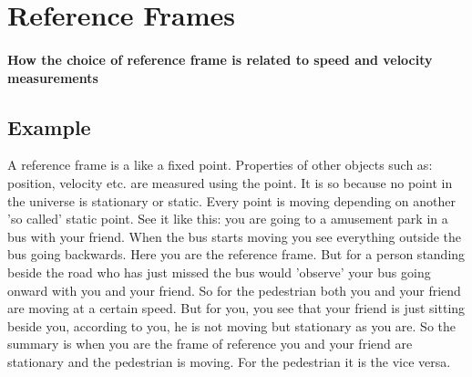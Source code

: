 \documentclass{article}
\theoremstyle{mytheoremstyle}
\theoremstyle{mytheoremstyle}
\theoremstyle{myproblemstyle}
\begin{document}
\section{Reference Frames}
\paragraph{How the choice of reference frame is related to speed and velocity measurements}
\subsection{Example}
A reference frame is a like a fixed point. Properties of other objects such as: position, velocity etc. are measured using the point.
    It is so because no point in the universe is stationary or static. Every point is moving depending on another 'so called' static point.
    See it like this: you are going to a amusement park in a bus with your friend. When the bus starts moving you see everything outside the bus going backwards. Here you are the reference frame. But for a person standing beside the road who has just missed the bus would 'observe' your bus going onward with you and your friend. So for the pedestrian both you and your friend are moving at a certain speed. But for you, you see that your friend is just sitting beside you, according to you, he is not moving but stationary as you are.
    So the summary is when you are the frame of reference you and your friend are stationary and the pedestrian is moving. For the pedestrian it is the vice versa.
\end{document}

